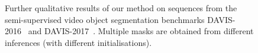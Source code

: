 \begin{figure}
\centering

\caption{Further qualitative results of our method on sequences from the semi-supervised video object segmentation benchmarks DAVIS-2016~\cite{perazzi2016benchmark} and DAVIS-2017~\cite{pont2017davis}.
Multiple masks are obtained from different inferences (with different initialisations).
}
\label{fig:appendix_davis16}
\end{figure}
